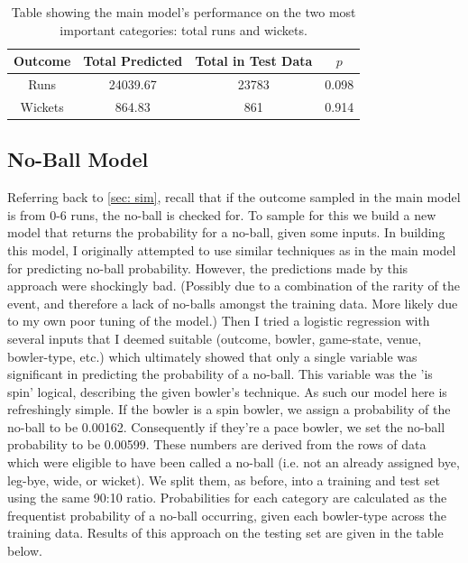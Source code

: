 \begin{table}[h]
\vspace{0.5em}
\centering
\begin{tabular} {c c c c} \toprule
    {Outcome} & {Total Predicted} & {Total in Test Data} & {$p$} \\ \midrule
     Runs & 24039.67 & 23783 & 0.098 \\
     Wickets & 864.83 & 861 & 0.914 \\ \bottomrule
\end{tabular}
\caption{Table showing the main model's performance on the two most important categories: total runs and wickets.}
\label{table: main model2}
\end{table}

\subsection{No-Ball Model}

Referring back to \cref{sec: sim}, recall that if the outcome sampled in the main model is from 0-6 runs, the no-ball is checked for. To sample for this we build a new model that returns the probability for a no-ball, given some inputs. In building this model, I originally attempted to use similar techniques as in the main model for predicting no-ball probability. However, the predictions made by this approach were shockingly bad. (Possibly due to a combination of the rarity of the event, and therefore a lack of no-balls amongst the training data. More likely due to my own poor tuning of the model.) Then I tried a logistic regression with several inputs that I deemed suitable (outcome, bowler, game-state, venue, bowler-type, etc.) which ultimately showed that only a single variable was significant in predicting the probability of a no-ball. This variable was the 'is spin' logical, describing the given bowler's technique. As such our model here is refreshingly simple. If the bowler is a spin bowler, we assign a probability of the no-ball to be 0.00162. Consequently if they're a pace bowler, we set the no-ball probability to be 0.00599. These numbers are derived from the rows of data which were eligible to have been called a no-ball (i.e. not an already assigned bye, leg-bye, wide, or wicket). We split them, as before, into a training and test set using the same 90:10 ratio. Probabilities for each category are calculated as the frequentist probability of a no-ball occurring, given each bowler-type across the training data. Results of this approach on the testing set are given in the table below.

